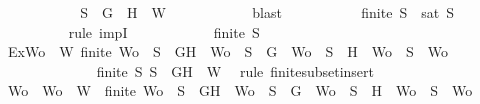 \begin{isabellebody}
\ \ \ \ \ \ \ \ \isamarkupfalse%
\ \isamarkupfalse%
\ {\isachardoublequoteopen}S{\isacharprime}\ {\isasymsubseteq}\ {\isacharbraceleft}G{\isacharbraceright}\ {\isasymunion}\ {\isacharparenleft}{\isacharbraceleft}H{\isacharbraceright}\ {\isasymunion}\ W{\isacharparenright}{\isachardoublequoteclose}\isanewline
\ \ \ \ \ \ \ \ \ \ \isamarkupfalse%
\ blast\ \isanewline
\ \ \ \ \ \ \ \ \isamarkupfalse%
\ {\isachardoublequoteopen}finite\ S{\isacharprime}\ {\isasymlongrightarrow}\ sat\ S{\isacharprime}{\isachardoublequoteclose}\isanewline
\ \ \ \ \ \ \ \ \isamarkupfalse%
\ {\isacharparenleft}rule\ impI{\isacharparenright}\isanewline
\ \ \ \ \ \ \ \ \ \ \isamarkupfalse%
\ {\isachardoublequoteopen}finite\ S{\isacharprime}{\isachardoublequoteclose}\ \isanewline
\ \ \ \ \ \ \ \ \ \ \isamarkupfalse%
\ Ex{\isacharcolon}{\isachardoublequoteopen}{\isasymexists}Wo\ {\isasymsubseteq}\ W{\isachardot}\ finite\ Wo\ {\isasymand}\ {\isacharparenleft}S{\isacharprime}\ {\isacharequal}\ {\isacharbraceleft}G{\isacharcomma}H{\isacharbraceright}\ {\isasymunion}\ Wo\ {\isasymor}\ S{\isacharprime}\ {\isacharequal}\ {\isacharbraceleft}G{\isacharbraceright}\ {\isasymunion}\ Wo\ {\isasymor}\ S{\isacharprime}\ {\isacharequal}\ {\isacharbraceleft}H{\isacharbraceright}\ {\isasymunion}\ Wo\ {\isasymor}\ S{\isacharprime}\ {\isacharequal}\ Wo{\isacharparenright}{\isachardoublequoteclose}\isanewline
\ \ \ \ \ \ \ \ \ \ \ \ \isamarkupfalse%
\ {\isacartoucheopen}finite\ S{\isacharprime}{\isacartoucheclose}\ {\isacartoucheopen}S{\isacharprime}\ {\isasymsubseteq}\ {\isacharbraceleft}G{\isacharcomma}H{\isacharbraceright}\ {\isasymunion}\ W{\isacartoucheclose}\ \isamarkupfalse%
\ {\isacharparenleft}rule\ finite{\isacharunderscore}subset{\isacharunderscore}insert{}{\isacharparenright}\isanewline
\ \ \ \ \ \ \ \ \ \ \isamarkupfalse%
\ Wo{\isacharprime}\ \ {\isachardoublequoteopen}Wo{\isacharprime}\ {\isasymsubseteq}\ W{\isachardoublequoteclose}\ \ {}{\isacharcolon}{\isachardoublequoteopen}finite\ Wo{\isacharprime}\ {\isasymand}\ {\isacharparenleft}S{\isacharprime}\ {\isacharequal}\ {\isacharbraceleft}G{\isacharcomma}H{\isacharbraceright}\ {\isasymunion}\ Wo{\isacharprime}\ {\isasymor}\ S{\isacharprime}\ {\isacharequal}\ {\isacharbraceleft}G{\isacharbraceright}\ {\isasymunion}\ Wo{\isacharprime}\ {\isasymor}\ S{\isacharprime}\ {\isacharequal}\ {\isacharbraceleft}H{\isacharbraceright}\ {\isasymunion}\ Wo{\isacharprime}\ {\isasymor}\ S{\isacharprime}\ {\isacharequal}\ Wo{\isacharprime}{\isacharparenright}{\isachardoublequoteclose}\isanewline

\end{isabellebody}
